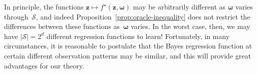 \documentclass[12pt]{article}
\begin{document}
In principle, the functions $\bm z \mapsto f^\star(\bm z, \bm \omega)$ may be arbitrarily different as $\bm \omega$ varies through~$\mathcal{S}$, and indeed Proposition~\ref{prop:oracle-inequality} does not restrict the differences between these functions as~$\bm \omega$ varies.  In the worst case, then, we may have $|\mathcal{S}| = 2^d$ different regression functions to learn!  Fortunately, in many circumstances, it is reasonable to postulate that the Bayes regression function at certain different observation patterns may be similar, and this will provide great advantages for our theory. 


\end{document}
